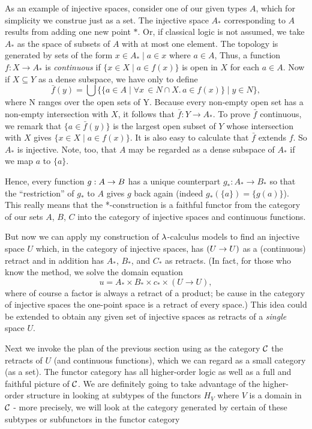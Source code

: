 As an example of injective spaces, consider one of our given types $A$, which for simplicity we construe just as a set.
The injective space $A_*$ corresponding to $A$ results from adding one new point $*$. Or, if classical logic is not assumed, we take $A_*$ as the space of subsets of $A$ with at most one element. The topology is generated by sets of the form ${x \in A_* \mid  a \in x}$ where $a \in A$, Thus, a function $f : X \to A_*$ is {\it continuous} if $\{x \in X \mid a \in f(x)\}$ is open in $X$ for each $a \in A$. Now if $X \subseteq Y$ as a dense subspace, we have only to define
$$
\bar{f}(y) = \bigcup \bigl\{\{a \in A \mid \forall x\, \in N \cap X.\, a \in f(x)\} \mid y \in N\bigr \},
$$
where N ranges over the open sets of Y. Because every non-empty open set has a non-empty intersection with $X$, it follows that
$\bar{f} : Y \to A_*$. To prove $\bar{f}$ continuous, we remark that $\{a \in \bar{f}(y)\}$ is the largest open subset of $Y$ whose intersection with $X$ gives $\{x \in X \mid a \in f(x)\}$. It is also easy to
calculate that $\bar{f}$ extends $f$. So $A_*$ is injective. Note, too, that $A$ may be regarded as a dense subspace of $A_*$ if we map $a$ to $\{a\}$.

Hence, every function $g:A \rightarrow B$ has a unique counterpart $g_* : A_*\to B_*$ so that the ``restriction'' of $g_*$ to $A$ gives $g$ back again (indeed $g_*(\{a\}) = \{g(a)\}$). This really means that the *-construction is a faithful functor from the category of our sets $A$, $B$, $C$ into the category of injective spaces and continuous functions.

But now we can apply my construction of $\lambda$-calculus models to find an injective space $U$ which, in the category of injective spaces, has $(U\rightarrow U)$ as a (continuous) retract and in addition has $A_*$, $B_*$, and $C_*$ as retracts. (In fact, for those who know the method, we solve the domain equation
$$
u = A_* \times B_* \times c_* \times (U \to U),
$$
where of course a factor is always a retract of a product; be cause in the category of injective spaces the one-point space is a retract of every space.) This idea could be extended to obtain any given set of injective spaces as retracts of a {\it single} space $U$.

Next we invoke the plan of the previous section using as the category $\mathcal C$ the retracts of $U$ (and continuous functions), which we can regard as a small category (as a set). The functor category has all higher-order logic as well as a full and faithful picture of $\mathcal C$. We are definitely going to take advantage of the higher-order structure in looking at subtypes of the functors $H_V$ where $V$ is a domain in $\mathcal C$ - more precisely, we will look at the category generated by certain of these subtypes or
subfunctors in the functor category


